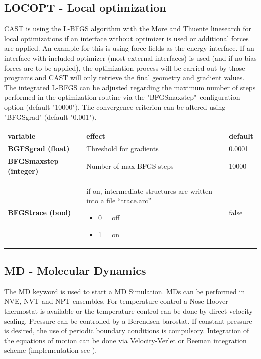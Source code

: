 \documentclass[10pt,a4paper]{article} %
\begin{document}
	\subsection{LOCOPT - Local optimization}
	\label{sec:locopt}
	\ac{CAST} is using the L-BFGS algorithm\supercite{bfgs} with the More and Thuente linesearch\supercite{morethuente} for local optimizations if an interface without optimizer is used or additional forces are applied. An example for this is using force fields as the energy interface.  
	If an interface with included optimizer (most external interfaces) is used (and if no bias forces are to be applied), the optimization process will be carried out by those programs and \ac{CAST} will only retrieve the final geometry and gradient values.
	The integrated L-BFGS can be adjusted regarding the maximum number of steps performed in the optimization routine via the "BFGSmaxstep"\ configuration option $($default "10000"$)$.
	The convergence criterion can be altered using "BFGSgrad" $($default "0.001"$)$.

	\begin{longtable}{|p{4cm}|p{5cm}|p{2cm}|}
		variable & effect & default \\
		\hline
		\textbf{BGFSgrad (float)} & Threshold for gradients & 0.0001 \\
		\textbf{BFGSmaxstep (integer)} & Number of max BFGS steps & 10000 \\
		\textbf{BFGStrace (bool)} & if on, intermediate structures are written into a file ``trace.arc'' \begin{itemize} \item 0 = off \item 1 = on\end{itemize} & false \\
	\end{longtable}

	\subsection{MD - Molecular Dynamics}
	The MD keyword is used to start a \acf{MD} Simulation\supercite{md_art}. \acp{MD} can be performed in NVE, NVT and NPT ensembles. For temperature control a Nose-Hoover thermostat\supercite{nose,hoover} is available or the temperature control can be done by direct velocity scaling. Pressure can be controlled by a Berendsen-barostat\supercite{berendsen}. If constant pressure is desired, the use of periodic boundary conditions is compulsory. Integration of the equations of motion can be done via Velocity-Verlet or Beeman\supercite{beeman} integration scheme (implementation see \cite{becker_development_2015}). 
\end{document}
